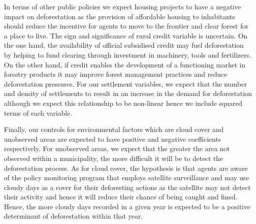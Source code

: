 In terms of other public policies we expect housing projects to have a negative impact on deforestation as the provision of affordable housing to inhabitants should reduce the incentive for agents to move to the frontier and clear forest for a place to live. The sign and significance of rural credit variable is uncertain. On the one hand, the availability of official subsidised credit may fuel deforestation by helping to fund clearing through investment in machinery, tools and fertilizers. On the other hand, if credit enables the development of a functioning market in forestry products it may improve forest management practices and reduce deforestation pressures. For our settlement variables, we expect that the number and density of settlements to result in an increase in the demand for deforestation although we expect this relationship to be non-linear hence we include squared terms of each variable.

Finally, our controls for environmental factors which are cloud cover and unobserved areas are expected to have positive and negative coefficients respectively. For unobserved areas, we expect that the greater the area not observed within a municipality, the more difficult it will be to detect the deforestation process. As for cloud cover, the hypothesis is that agents are aware of the policy monitoring program that employs satellite surveillance and may use cloudy days as a cover for their deforesting actions as the satellite may not detect their activity and hence it will reduce their chance of being caught and fined.  Hence, the more cloudy days recorded in a given year is expected to be a positive determinant of deforestation within that year.




						




